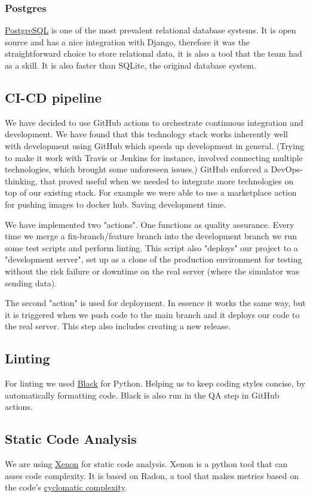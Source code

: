 \documentclass[12pt]{article}
\begin{document}
\subsubsection{Postgres}
\href{https://www.postgresql.org/}{PostgreSQL} is one of the most prevalent relational database systems. It is open source and has a nice integration with Django, therefore it was the straightforward choice to store relational data, it is also a tool that the team had as a skill. It is also faster than SQLite, the original database system.


\subsection{CI-CD pipeline}
We have decided to use GitHub actions to orchestrate continuous integration and development. We have found that this technology stack works inherently well with development using GitHub which speeds up development in general. (Trying to make it work with Travis or Jenkins for instance, involved connecting multiple technologies, which brought some unforeseen issues.) GitHub enforced a DevOps-thinking, that proved useful when we needed to integrate more technologies on top of our existing stack. For example we were able to use a marketplace action for pushing images to docker hub. Saving development time.

We have implemented two "actions". One functions as quality assurance. Every time we merge a fix-branch/feature branch into the development branch we run some test scripts and perform linting. This script also "deploys" our project to a "development server", set up as a clone of the production environment for testing without the risk failure or downtime on the real server (where the simulator was sending data).

The second "action" is used for deployment. In essence it works the same way, but it is triggered when we push code to the main branch and it deploys our code to the real server. This step also includes creating a new release.

\subsection{Linting}
For linting we used \href{https://github.com/psf/black}{Black} for Python. Helping us to keep coding styles concise, by automatically formatting code. Black is also run in the QA step in GitHub actions.

\subsection{Static Code Analysis}
We are using \href{https://xenon.readthedocs.io/en/stable/}{Xenon} for static code analysis. Xenon is a python tool that can asses code complexity. It is based on Radon, a tool that makes metrics based on the code's 
\href{https://radon.readthedocs.io/en/latest/intro.html}{cyclomatic complexity}. 
\end{document}

